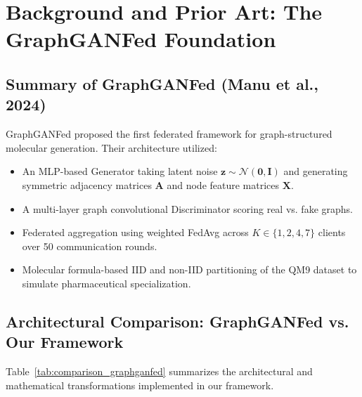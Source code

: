 \documentclass[12pt, a4paper]{article}
\begin{document}
\section{Background and Prior Art: The GraphGANFed Foundation}

\subsection{Summary of GraphGANFed (Manu et al., 2024)}
GraphGANFed \cite{manu2024graphganfed} proposed the first federated framework for graph-structured molecular generation. Their architecture utilized:
\begin{itemize}[noitemsep]
    \item An MLP-based Generator taking latent noise $\mathbf{z} \sim \mathcal{N}(\mathbf{0}, \mathbf{I})$ and generating symmetric adjacency matrices $\mathbf{A}$ and node feature matrices $\mathbf{X}$.
    \item A multi-layer graph convolutional Discriminator scoring real vs. fake graphs.
    \item Federated aggregation using weighted FedAvg across $K \in \{1, 2, 4, 7\}$ clients over 50 communication rounds.
    \item Molecular formula-based IID and non-IID partitioning of the QM9 dataset to simulate pharmaceutical specialization.
\end{itemize}

\subsection{Architectural Comparison: GraphGANFed vs. Our Framework}
Table~\ref{tab:comparison_graphganfed} summarizes the architectural and mathematical transformations implemented in our framework.
\end{document}
